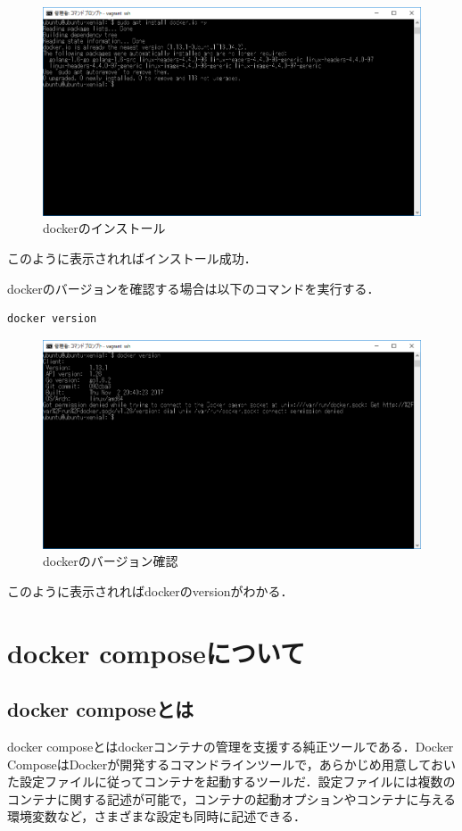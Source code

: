 \begin{figure}[h]
\centering
\includegraphics[width=12cm]{dockerinstall2.png}
\caption{dockerのインストール}\label{サンプル図}
\end{figure}


このように表示されればインストール成功．

\newpage


dockerのバージョンを確認する場合は以下のコマンドを実行する．

\begin{verbatim}
docker version
\end{verbatim}


\begin{figure}[h]
\centering
\includegraphics[width=12cm]{dockerversion.png}
\caption{dockerのバージョン確認}\label{サンプル図}
\end{figure}


このように表示されればdockerのversionがわかる．

\newpage


\section{docker composeについて}

\subsection{docker composeとは}
docker composeとはdockerコンテナの管理を支援する純正ツールである．Docker ComposeはDockerが開発するコマンドラインツールで，あらかじめ用意しておいた設定ファイルに従ってコンテナを起動するツールだ．設定ファイルには複数のコンテナに関する記述が可能で，コンテナの起動オプションやコンテナに与える環境変数など，さまざまな設定も同時に記述できる\cite{e}．


